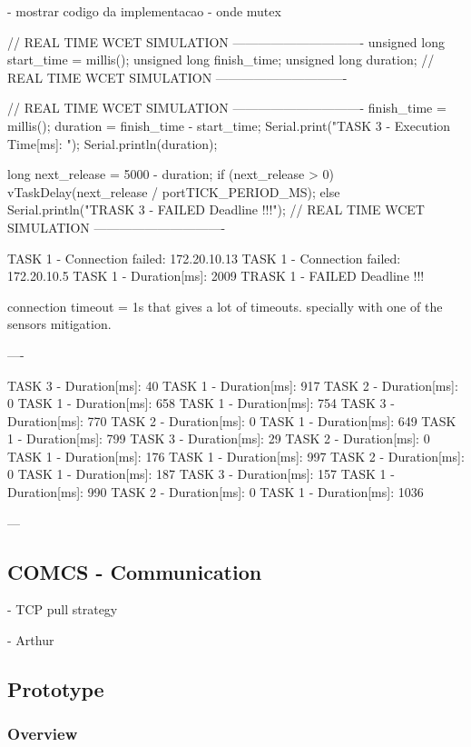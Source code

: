\documentclass[11pt]{article}
\begin{document}
- mostrar codigo da implementacao
- onde mutex

    // REAL TIME WCET SIMULATION -------------------------------
    unsigned long start_time = millis();
    unsigned long finish_time;
    unsigned long duration;
    // REAL TIME WCET SIMULATION -------------------------------

    // REAL TIME WCET SIMULATION -------------------------------
    finish_time = millis();      
    duration = finish_time - start_time;
    Serial.print("TASK 3 - Execution Time[ms]: ");
    Serial.println(duration); 
    
    long next_release = 5000 - duration;
    if (next_release > 0) {
      vTaskDelay(next_release / portTICK_PERIOD_MS);
    } else {
      Serial.println("TRASK 3 - FAILED Deadline !!!");
    }
    // REAL TIME WCET SIMULATION -------------------------------
    

TASK 1 - Connection failed: 172.20.10.13
TASK 1 - Connection failed: 172.20.10.5
TASK 1 - Duration[ms]: 2009
TRASK 1 - FAILED Deadline !!!

connection timeout = 1s
that gives a lot of timeouts. specially with one of the sensors
mitigation.

----

TASK 3 - Duration[ms]: 40
TASK 1 - Duration[ms]: 917
TASK 2 - Duration[ms]: 0
TASK 1 - Duration[ms]: 658
TASK 1 - Duration[ms]: 754
TASK 3 - Duration[ms]: 770
TASK 2 - Duration[ms]: 0
TASK 1 - Duration[ms]: 649
TASK 1 - Duration[ms]: 799
TASK 3 - Duration[ms]: 29
TASK 2 - Duration[ms]: 0
TASK 1 - Duration[ms]: 176
TASK 1 - Duration[ms]: 997
TASK 2 - Duration[ms]: 0
TASK 1 - Duration[ms]: 187
TASK 3 - Duration[ms]: 157
TASK 1 - Duration[ms]: 990
TASK 2 - Duration[ms]: 0
TASK 1 - Duration[ms]: 1036

---



\subsection{COMCS - Communication}

- TCP pull strategy

- Arthur

\subsection{Prototype}

\subsubsection{Overview}
\end{document}
